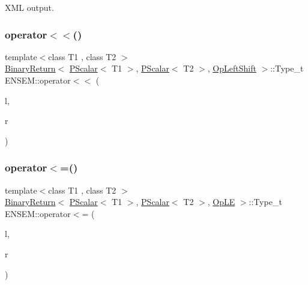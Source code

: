 X\+ML output. 

\mbox{\label{group__primscalar_ga39d346ef6c678a5a37348a5a403e955d}} 
\subsubsection{\texorpdfstring{operator$<$$<$()}{operator<<()}\hspace{0.1cm}{\footnotesize\ttfamily [4/4]}}
{\footnotesize\ttfamily template$<$class T1 , class T2 $>$ \\
\mbox{\hyperlink{structENSEM_1_1BinaryReturn}{Binary\+Return}}$<$ \mbox{\hyperlink{classENSEM_1_1PScalar}{P\+Scalar}}$<$ T1 $>$, \mbox{\hyperlink{classENSEM_1_1PScalar}{P\+Scalar}}$<$ T2 $>$, \mbox{\hyperlink{structENSEM_1_1OpLeftShift}{Op\+Left\+Shift}} $>$\+::Type\+\_\+t E\+N\+S\+E\+M\+::operator$<$$<$ (\begin{DoxyParamCaption}\item[{const \mbox{\hyperlink{classENSEM_1_1PScalar}{P\+Scalar}}$<$ T1 $>$ \&}]{l,  }\item[{const \mbox{\hyperlink{classENSEM_1_1PScalar}{P\+Scalar}}$<$ T2 $>$ \&}]{r }\end{DoxyParamCaption})\hspace{0.3cm}{\ttfamily [inline]}}

\mbox{\label{group__primscalar_gadc72d49cf80f5b61a37c029861a74a5f}} 
\subsubsection{\texorpdfstring{operator$<$=()}{operator<=()}}
{\footnotesize\ttfamily template$<$class T1 , class T2 $>$ \\
\mbox{\hyperlink{structENSEM_1_1BinaryReturn}{Binary\+Return}}$<$ \mbox{\hyperlink{classENSEM_1_1PScalar}{P\+Scalar}}$<$ T1 $>$, \mbox{\hyperlink{classENSEM_1_1PScalar}{P\+Scalar}}$<$ T2 $>$, \mbox{\hyperlink{structENSEM_1_1OpLE}{Op\+LE}} $>$\+::Type\+\_\+t E\+N\+S\+E\+M\+::operator$<$= (\begin{DoxyParamCaption}\item[{const \mbox{\hyperlink{classENSEM_1_1PScalar}{P\+Scalar}}$<$ T1 $>$ \&}]{l,  }\item[{const \mbox{\hyperlink{classENSEM_1_1PScalar}{P\+Scalar}}$<$ T2 $>$ \&}]{r }\end{DoxyParamCaption})\hspace{0.3cm}{\ttfamily [inline]}}

